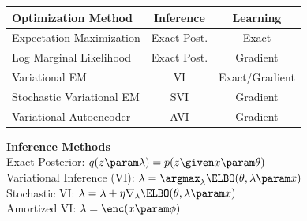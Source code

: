 \begin{frame}

\begin{table}[]
    \centering
    \begin{tabular}{l c c }
    \toprule
        Optimization Method  & Inference & Learning \\
    \midrule
         Expectation Maximization & Exact Post. & Exact \\
         Log Marginal Likelihood & Exact Post. & Gradient \\
         Variational EM & VI & Exact/Gradient \\
         Stochastic Variational EM & SVI & Gradient\\
         Variational Autoencoder & AVI & Gradient \\
         \bottomrule
    \end{tabular}
\end{table}
\vspace{-3mm}
\textbf{Inference Methods} \\
Exact Posterior: $q(z \param \lambda ) = p(z \given x \param \theta)$ \\
Variational Inference (VI): $\lambda = \argmax_\lambda \ELBO(\theta, \lambda \param x) $ \\
Stochastic VI: $\lambda = \lambda + \eta \nabla_\lambda \ELBO(\theta, \lambda \param x)$ \\
Amortized VI: $\lambda = \enc(x \param \phi) $
\end{frame}
